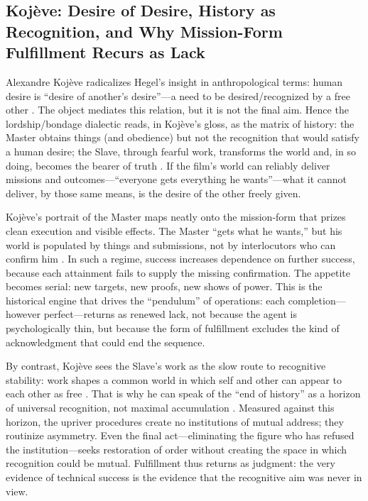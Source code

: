 \subsection*{Koj{\`e}ve: Desire of Desire, History as Recognition, and Why Mission-Form
	Fulfillment Recurs as Lack}
\label{ssec:iii-kojeve}
Alexandre Koj{\`e}ve radicalizes Hegel's insight in anthropological terms: human desire is
``desire of another's desire''—a need to be desired/recognized by a free other
\parencite[p.~6]{KojeveIRH1980}.
The object mediates this relation, but it is not the final aim. Hence the lordship/bondage
dialectic reads, in Koj{\`e}ve's gloss, as the matrix of history: the Master obtains things
(and obedience) but not the recognition that would satisfy a human desire; the Slave, through
fearful work, transforms the world and, in so doing, becomes the bearer of truth
\parencite[pp.~27--34, 158--164]{KojeveIRH1980}. If the film's world can reliably deliver
missions and outcomes—``everyone gets everything he wants''—what it cannot deliver, by those
same means, is the desire of the other freely given.

Koj{\`e}ve's portrait of the Master maps neatly onto the mission-form that prizes clean
execution and visible effects. The Master ``gets what he wants,'' but his world is populated by
things and submissions, not by interlocutors who can confirm him
\parencite[pp.~27--34]{KojeveIRH1980}. In such a regime, success increases dependence on further
success, because each attainment fails to supply the missing confirmation. The appetite becomes
serial: new targets, new proofs, new shows of power. This is the historical engine that drives
the ``pendulum'' of operations: each completion—however perfect—returns as renewed lack, not
because the agent is psychologically thin, but because the form of fulfillment excludes the kind
of acknowledgment that could end the sequence.

By contrast, Koj{\`e}ve sees the Slave's work as the slow route to recognitive stability: work
shapes a common world in which self and other can appear to each other as free
\parencite[pp.~158--164]{KojeveIRH1980}. That is why he can speak of the ``end of history'' as
a horizon of universal recognition, not maximal accumulation
\parencite[pp.~158--164]{KojeveIRH1980}. Measured against this horizon, the upriver procedures
create no institutions of mutual address; they routinize asymmetry. Even the final act—eliminating
the figure who has refused the institution—seeks restoration of order without creating the space
in which recognition could be mutual. Fulfillment thus returns as judgment: the very evidence of
technical success is the evidence that the recognitive aim was never in view.

